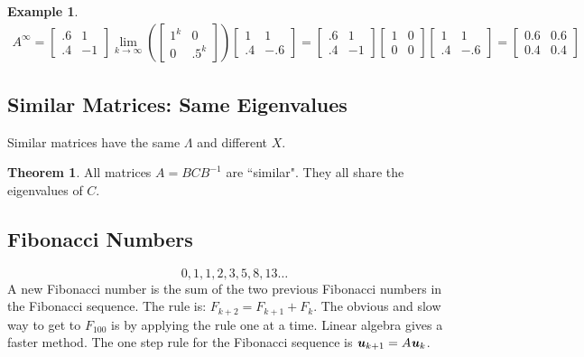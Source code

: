 \documentclass[12pt, letterpaper]{article}
\newcommand{\V}[1]{\textbf{\textit{#1}}}
\theoremstyle{definition}
\newtheorem{example}{Example}
\newtheorem{theorem}{Theorem}
\begin{document}
\begin{example}
\begin{gather*}
					A^\infty = \begin{bmatrix} .6 & 1 \\ .4 &-1 \end{bmatrix} \lim\limits_{k\rightarrow \infty} \left( \begin{bmatrix} 1^k & 0 \\ 0 & .5^k \end{bmatrix} \right)  \begin{bmatrix} 1 & 1 \\ .4 & -.6 \end{bmatrix} = \begin{bmatrix} .6 & 1 \\ .4 &-1 \end{bmatrix} \begin{bmatrix} 1 & 0 \\ 0 & 0 \end{bmatrix}  \begin{bmatrix} 1 & 1 \\ .4 & -.6 \end{bmatrix} = \begin{bmatrix}0.6&0.6\\ 0.4&0.4\end{bmatrix}
				\end{gather*}
		\end{example}
	
\subsection{Similar Matrices: Same Eigenvalues}
	Similar matrices have the same $\Lambda$ and different $X$.
	\begin{theorem}
		All matrices $A = B C B^{-1}$ are ``similar". They all share the eigenvalues of $C$.
	\end{theorem}
	
\subsection{Fibonacci Numbers}
	\begin{equation*}
		0, 1, 1, 2, 3, 5, 8, 13 \ldots
	\end{equation*}
	A new Fibonacci number is the sum of the two previous Fibonacci numbers in the Fibonacci sequence. The rule is: $F_{k+2} = F_{k+1} + F_{k}$. The obvious and slow way to get to $F_{100}$ is by applying the rule one at a time. Linear algebra gives a faster method. The one step rule for the Fibonacci sequence is $\V{u}_{k+1} = A \V{u}_k$.
	 
\end{document}
